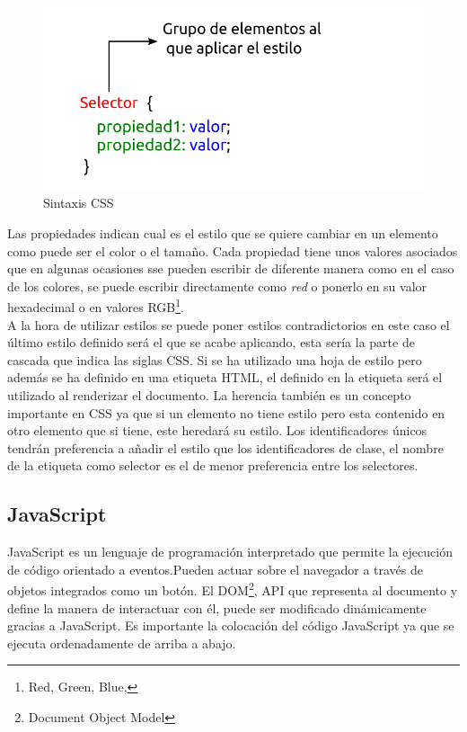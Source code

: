 \begin{figure}[H]
    \centering
    \includegraphics[width=12cm, keepaspectratio]{img/css.png}
    \caption{Sintaxis CSS}
    \label{fig:css}
\end{figure}
\newpage
Las propiedades indican cual es el estilo que se quiere cambiar en un elemento como puede ser el color o el tamaño. Cada propiedad tiene unos valores asociados que en algunas ocasiones sse pueden escribir de diferente manera como en el caso de los colores, se puede escribir directamente como \textit{red} o ponerlo en su valor hexadecimal o en valores RGB\footnote{ Red, Green, Blue,}.\\

A la hora de utilizar estilos se puede poner estilos contradictorios en este caso el último estilo definido será el que se acabe aplicando, esta sería la parte de cascada que indica las siglas CSS. Si se ha utilizado una hoja de estilo pero además se ha definido en una etiqueta HTML, el definido en la etiqueta será el utilizado al renderizar el documento. La herencia también es un concepto importante en CSS ya que si un elemento no tiene estilo pero esta contenido en otro elemento que si tiene, este heredará su estilo. Los identificadores únicos tendrán preferencia a añadir el estilo que los identificadores de clase, el nombre de la etiqueta como selector es el de menor preferencia entre los selectores.\cite{juan3}


\subsection{JavaScript}
JavaScript es un lenguaje de programación interpretado que permite la ejecución de código orientado a eventos.Pueden actuar sobre el navegador a través de objetos integrados como un botón. El DOM\footnote{Document Object Model}, API que representa al documento y define la manera de interactuar con él, puede ser modificado dinámicamente gracias a JavaScript. Es importante la colocación del código JavaScript ya que se ejecuta ordenadamente de arriba a abajo. \\

